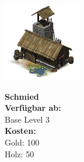 \documentclass{scrartcl}
\begin{document}
\begin{minipage}{0.3\textwidth}
	\includegraphics[width=\textwidth]{imgSmith.png}
\end{minipage}
\hfill
\begin{minipage}{0.5\textwidth}
	\textbf{Schmied}\\
	
	\textbf{Verfügbar ab: }\\ Base Level 3\\
	\textbf{Kosten:
	}\\
	Gold: 100 \\
	Holz: 50\\
	
\end{minipage}
\end{document}
